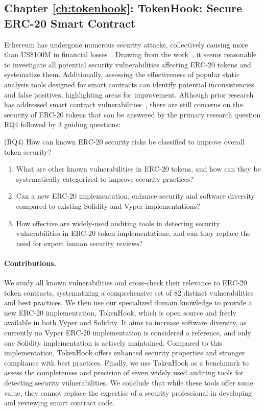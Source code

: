 \subsection{Chapter \ref{ch:tokenhook}: TokenHook: Secure ERC-20 Smart Contract}
Ethereum has undergone numerous security attacks, collectively causing more than US\$100M in financial losses~\cite{DAO1,PeckShield,PartiyMultiSig,MyEthWallet,ParityFirstHack,ParitySecondHack}. Drawing from the \mwa work~\cite{MultipleWithdrawal}, it seems reasonable to investigate all potential security vulnerabilities affecting ERC-20 tokens and systematize them. Additionally, assessing the effectiveness of popular static analysis tools designed for smart contracts can identify potential inconsistencies and false positives, highlighting areas for improvement. Although prior research has addressed smart contract vulnerabilities~\cite{EthSecServ}, there are still concerns on the security of ERC-20 tokens that can be answered by the primary research question RQ4 followed by 3 guiding questions:

\noindent (RQ4) How can known ERC-20 security risks be classified to improve overall token security?
\begin{enumerate}[label={(RQ4.\arabic*)},leftmargin=*]
	\item What are other known vulnerabilities in ERC-20 tokens, and how can they be systematically categorized to improve security practices?
	\item Can a new ERC-20 implementation, enhance security and software diversity compared to existing Solidity and Vyper implementations?
	\item How effective are widely-used auditing tools in detecting security vulnerabilities in ERC-20 token implementations, and can they replace the need for expert human security reviews?
\end{enumerate}
\paragraph{Contributions.} We study all known vulnerabilities and cross-check their relevance to ERC-20 token contracts, systematizing a comprehensive set of 82 distinct vulnerabilities and best practices. We then use our specialized domain knowledge to provide a new ERC-20 implementation, TokenHook, which is open source and freely available in both Vyper and Solidity. It aims to increase software diversity, as currently no Vyper ERC-20 implementation is considered a reference, and only one Solidity implementation is actively maintained. Compared to this implementation, TokenHook offers enhanced security properties and stronger compliance with best practices. Finally, we use TokenHook as a benchmark to assess the completeness and precision of seven widely used auditing tools for detecting security vulnerabilities. We conclude that while these tools offer some value, they cannot replace the expertise of a security professional in developing and reviewing smart contract code.

